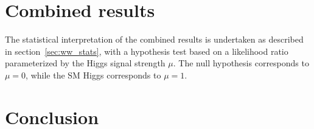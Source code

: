 \section{Combined results}

The statistical interpretation of the combined results is undertaken as described in section~\ref{sec:ww_stats}, with a hypothesis test based on a likelihood ratio parameterized by the Higgs signal strength $\mu$. The null hypothesis corresponds to $\mu = 0$, while the SM Higgs corresponds to $\mu = 1$. 

\section{Conclusion}


